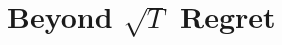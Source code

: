 \documentclass[../main]{subfiles}
\begin{document}
\setcounter{chapter}{3}

\chapter{Beyond $ \sqrt{T} $ Regret}






\ifSubfilesClassLoaded{%
%
}{}
\end{document}
